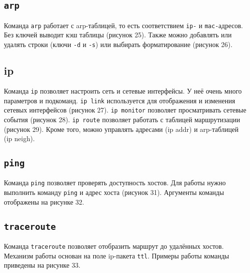 \FloatBarrier


\subsection{\texttt{arp}}

Команда \texttt{arp} работает с arp-таблицей, то есть соответствием \texttt{ip-} и \texttt{mac-}адресов. Без ключей выводит кэш таблицы (рисунок 25). Также можно добавлять или удалять строки (ключи \texttt{-d} и \texttt{-s}) или выбирать форматирование (рисунок 26).

\FloatBarrier

\clearpage

\subsection{ip}

Команда \texttt{ip} позволяет настроить сеть и сетевые интерфейсы. У неё очень много параметров и подкоманд. \texttt{ip link} используется для отображения и изменения сетевых интерфейсов (рисунок 27). \texttt{ip monitor} позволяет просматривать сетевые события (рисунок 28). \texttt{ip route} позволяет работать с таблицей маршрутизации (рисунок 29). Кроме того, можно управлять адресами ({ip addr}) и arp-таблицей ({ip neigh}).

\FloatBarrier


\subsection{\texttt{ping}}

Команда \texttt{ping} позволяет проверять доступность хостов. Для работы нужно выполнить команду \texttt{ping} и адрес хоста (рисунок 31). Аргументы команды отображены на рисунке 32.

\FloatBarrier


\subsection{\texttt{traceroute}}

Команда \texttt{traceroute} позволяет отобразить маршрут до удалённых хостов. Механизм работы основан на поле ip-пакета \texttt{ttl}. Примеры работы команды приведены на рисунке 33.

